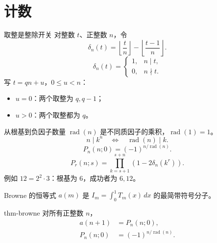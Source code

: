 \documentclass{beamer}
\begin{document}
\section{计数}
\begin{frame}{取整是整除开关}
对整数 $t$、正整数 $n$，令
\[
\delta_n(t)=\left\lfloor\frac tn\right\rfloor-\left\lfloor\frac{t-1}{n}\right\rfloor.
\]
\[
\delta_n(t)=\begin{cases}1,&n\mid t,\\0,&n\nmid t.\end{cases}
\]
写 $t=qn+u$，$0\le u<n$：
\begin{itemize}
\item $u=0$：两个取整为 $q,q-1$；
\item $u>0$：两个取整都为 $q$。
\end{itemize}
\end{frame}
\begin{frame}{从根基到负因子数量}
$\operatorname{rad}(n)$ 是不同质因子的乘积，$\operatorname{rad}(1)=1$。
\[
n\mid k^n\quad\Longleftrightarrow\quad\operatorname{rad}(n)\mid k.
\]
\[
P_n(n;0)=(-1)^{n/\operatorname{rad}(n)}.
\]
\[
P_r(n;s)=\prod_{k=s+1}^{s+n}(1-2\delta_n(k^r)).
\]
例如 $12=2^2\cdot3$：根基为 $6$，成功者为 $6,12$。
\end{frame}
\begin{frame}{Browne 的恒等式}
$a(m)$ 是 $I_m=\int_0^1T_m(x)\,dx$ 的最简带符号分子。
\begin{bookresult}{thm-browne}
对所有正整数 $n$，
\[
\begin{aligned}
a(n+1)&=P_n(n;0),\\
P_n(n;0)&=(-1)^{n/\operatorname{rad}(n)}.
\end{aligned}
\]
\end{bookresult}
\end{frame}
\end{document}
